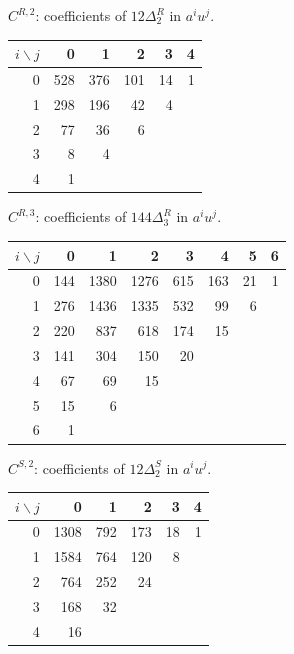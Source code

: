 \documentclass[11pt,a4paper]{article}
\begin{document}
\begin{center}
\begin{minipage}{1\textwidth}
\centering\small
$C^{R,2}$: coefficients of $12\Delta^{R}_{2}$ in $a^i u^j$.\par\smallskip
\begin{tabular}{r|rrrrr}
$i\backslash j$ & 0 & 1 & 2 & 3 & 4 \\
\hline
0 & 528 & 376 & 101 & 14 & 1 \\
1 & 298 & 196 & 42 & 4 &  \\
2 & 77 & 36 & 6 &  &  \\
3 & 8 & 4 &  &  &  \\
4 & 1 &  &  &  &  \\
\end{tabular}
\end{minipage}
\end{center}
\begin{center}
\begin{minipage}{1\textwidth}
\centering\small
$C^{R,3}$: coefficients of $144\Delta^{R}_{3}$ in $a^i u^j$.\par\smallskip
\begin{tabular}{r|rrrrrrr}
$i\backslash j$ & 0 & 1 & 2 & 3 & 4 & 5 & 6 \\
\hline
0 & 144 & 1380 & 1276 & 615 & 163 & 21 & 1 \\
1 & 276 & 1436 & 1335 & 532 & 99 & 6 &  \\
2 & 220 & 837 & 618 & 174 & 15 &  &  \\
3 & 141 & 304 & 150 & 20 &  &  &  \\
4 & 67 & 69 & 15 &  &  &  &  \\
5 & 15 & 6 &  &  &  &  &  \\
6 & 1 &  &  &  &  &  &  \\
\end{tabular}
\end{minipage}
\end{center}
\begin{center}
\begin{minipage}{1\textwidth}
\centering\small
$C^{S,2}$: coefficients of $12\Delta^{S}_{2}$ in $a^i u^j$.\par\smallskip
\begin{tabular}{r|rrrrr}
$i\backslash j$ & 0 & 1 & 2 & 3 & 4 \\
\hline
0 & 1308 & 792 & 173 & 18 & 1 \\
1 & 1584 & 764 & 120 & 8 &  \\
2 & 764 & 252 & 24 &  &  \\
3 & 168 & 32 &  &  &  \\
4 & 16 &  &  &  &  \\
\end{tabular}
\end{minipage}
\end{center}
\end{document}
